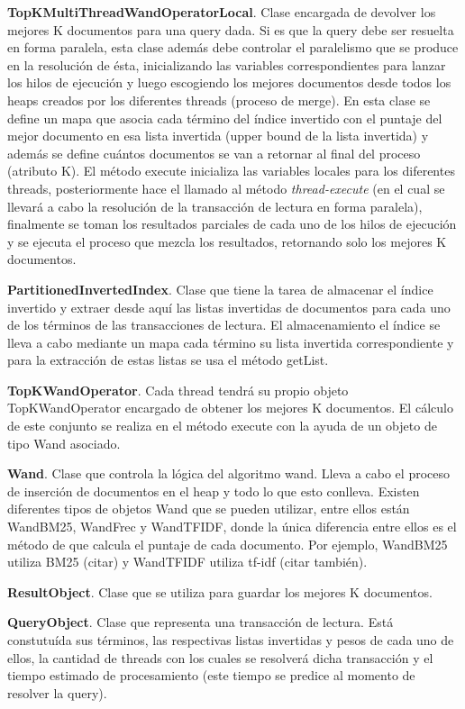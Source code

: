 \begin{list}{}{}
	\item \textbf{TopKMultiThreadWandOperatorLocal}. Clase encargada de devolver los mejores K documentos para una query dada. Si es que la query debe ser resuelta en forma paralela, esta clase además debe controlar el paralelismo que se produce en la resolución de ésta, inicializando las variables correspondientes para lanzar los hilos de ejecución y luego escogiendo los mejores documentos desde todos los heaps creados por los diferentes threads (proceso de merge). En esta clase se define un mapa que asocia cada término del índice invertido con el puntaje del mejor documento en esa lista invertida (upper bound de la lista invertida) y además se define cuántos documentos se van a retornar al final del proceso (atributo K). El método execute inicializa las variables locales para los diferentes threads, posteriormente hace el llamado al método \emph{thread-execute} (en el cual se llevará a cabo la resolución de la transacción de lectura en forma paralela), finalmente se toman los resultados parciales de cada uno de los hilos de ejecución y se ejecuta el proceso que mezcla los resultados, retornando solo los mejores K documentos. 
	
	\item \textbf{PartitionedInvertedIndex}. Clase que tiene la tarea de almacenar el índice invertido y extraer desde aquí las listas invertidas de documentos para cada uno de los términos de las transacciones de lectura. El almacenamiento el índice se lleva a cabo mediante un mapa cada término su lista invertida correspondiente y para la extracción de estas listas se usa el método getList.
	
	\item \textbf{TopKWandOperator}.  Cada thread tendrá su propio objeto TopKWandOperator encargado de obtener los mejores K documentos. El cálculo de este conjunto se realiza en el método execute con la ayuda de un objeto de tipo Wand asociado.
	
	\item \textbf{Wand}. Clase que controla la lógica del algoritmo wand. Lleva a cabo el proceso de inserción de documentos en el heap y todo lo que esto conlleva. Existen diferentes tipos de objetos Wand que se pueden utilizar, entre ellos están WandBM25, WandFrec y WandTFIDF, donde la única diferencia entre ellos es el método de que calcula el puntaje de cada documento. Por ejemplo, WandBM25 utiliza BM25 (citar) y WandTFIDF utiliza tf-idf (citar también). 
	
	\item \textbf{ResultObject}. Clase que se utiliza para guardar los mejores K documentos.
	
	\item \textbf{QueryObject}. Clase que representa una transacción de lectura. Está constutuída sus términos,  las respectivas listas invertidas y pesos de cada uno de ellos, la cantidad de threads con los cuales se resolverá dicha transacción y el tiempo estimado de procesamiento (este tiempo se predice al momento de resolver la query).

\end{list}


